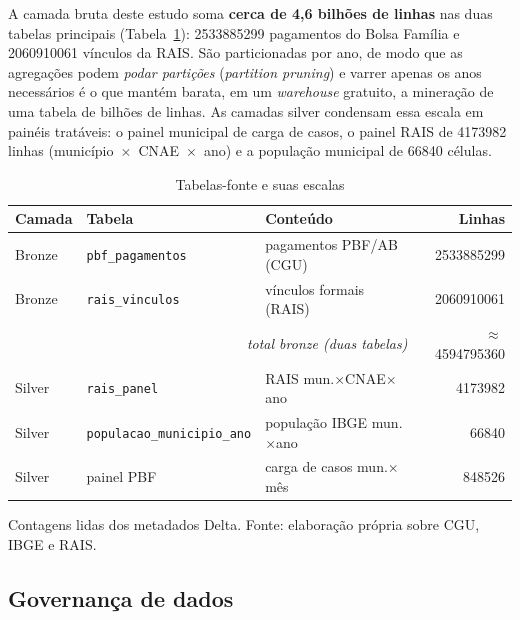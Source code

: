 \documentclass[12pt,a4paper,oneside]{article}
\begin{document}
A camada bruta deste estudo soma \textbf{cerca de 4,6 bilhões de linhas}
nas duas tabelas principais (Tabela~\ref{tab:bronze}): \num{2533885299}
pagamentos do Bolsa Família e \num{2060910061} vínculos da RAIS. São
particionadas por ano, de modo que as agregações podem \emph{podar
partições} (\emph{partition pruning}) e varrer apenas os anos necessários
\textemdash{} é o que mantém barata, em um \emph{warehouse} gratuito, a
mineração de uma tabela de bilhões de linhas. As camadas silver
condensam essa escala em painéis tratáveis: o painel municipal de carga de
casos, o painel RAIS de \num{4173982} linhas (município~$\times$~CNAE~$\times$~ano)
e a população municipal de \num{66840} células.

\begin{table}[H]
\centering
\caption{Tabelas-fonte e suas escalas}
\label{tab:bronze}
\small
\begin{tabular}{@{}lllr@{}}
\toprule
\textbf{Camada} & \textbf{Tabela} & \textbf{Conteúdo} & \textbf{Linhas} \\
\midrule
Bronze & \texttt{pbf\_pagamentos}  & pagamentos PBF/AB (CGU)        & \num{2533885299} \\
Bronze & \texttt{rais\_vinculos}   & vínculos formais (RAIS)         & \num{2060910061} \\
\midrule
\multicolumn{3}{r}{\textit{total bronze (duas tabelas)}} & $\approx$\,\num{4594795360} \\
\midrule
Silver & \texttt{rais\_panel}              & RAIS mun.$\times$CNAE$\times$ano & \num{4173982} \\
Silver & \texttt{populacao\_municipio\_ano}& população IBGE mun.$\times$ano    & \num{66840} \\
Silver & painel PBF                        & carga de casos mun.$\times$mês     & \num{848526} \\
\bottomrule
\end{tabular}
\par\smallskip
{\footnotesize Contagens lidas dos metadados Delta. Fonte: elaboração
própria sobre CGU, IBGE e RAIS.}
\end{table}

\subsection{Governança de dados}
\end{document}
